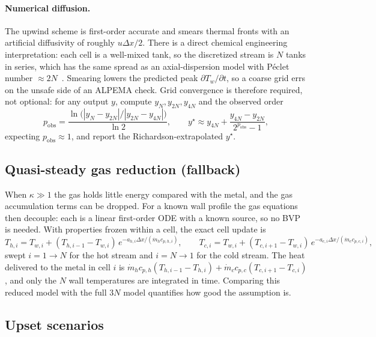 \documentclass[11pt]{article}
\begin{document}
\paragraph{Numerical diffusion.} The upwind scheme is first-order accurate and smears thermal fronts with an artificial diffusivity of roughly $u\Delta x/2$. There is a direct chemical engineering interpretation: each cell is a well-mixed tank, so the discretized stream is $N$ tanks in series, which has the same spread as an axial-dispersion model with P\'eclet number $\approx 2N$~\cite{levenspiel1999}. Smearing lowers the predicted peak $\partial T_w/\partial t$, so a coarse grid errs on the unsafe side of an ALPEMA check. Grid convergence is therefore required, not optional: for any output $y$, compute $y_N, y_{2N}, y_{4N}$ and the observed order
\begin{equation}
  p_{\mathrm{obs}} = \frac{\ln\!\big(|y_N - y_{2N}| / |y_{2N} - y_{4N}|\big)}{\ln 2},
  \qquad
  y^\star \approx y_{4N} + \frac{y_{4N} - y_{2N}}{2^{p_{\mathrm{obs}}} - 1},
\end{equation}
expecting $p_{\mathrm{obs}} \approx 1$, and report the Richardson-extrapolated $y^\star$.

\subsection{Quasi-steady gas reduction (fallback)}

When $\kappa \gg 1$ the gas holds little energy compared with the metal, and the gas accumulation terms can be dropped. For a known wall profile the gas equations then decouple: each is a linear first-order ODE with a known source, so no BVP is needed. With properties frozen within a cell, the exact cell update is
\begin{equation}
  T_{h,i} = T_{w,i} + (T_{h,i-1} - T_{w,i})\, e^{-a_{h,i}\Delta x/(\dot m_h c_{p,h,i})},
  \qquad
  T_{c,i} = T_{w,i} + (T_{c,i+1} - T_{w,i})\, e^{-a_{c,i}\Delta x/(\dot m_c c_{p,c,i})},
\end{equation}
swept $i = 1 \to N$ for the hot stream and $i = N \to 1$ for the cold stream. The heat delivered to the metal in cell $i$ is $\dot m_h c_{p,h}(T_{h,i-1} - T_{h,i}) + \dot m_c c_{p,c}(T_{c,i+1} - T_{c,i})$, and only the $N$ wall temperatures are integrated in time. Comparing this reduced model with the full $3N$ model quantifies how good the assumption is.

\subsection{Upset scenarios}
\end{document}
